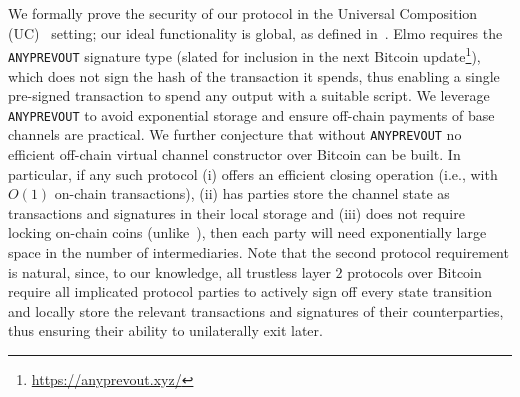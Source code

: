   We formally prove the security of our protocol in the Universal
  Composition (UC)~\cite{uc} setting; our ideal functionality is global,
  as defined in~\cite{DBLP:conf/tcc/BadertscherCHTZ20}. Elmo requires the \texttt{ANYPREVOUT} signature type (slated for
  inclusion in the next Bitcoin update\footnote{\url{https://anyprevout.xyz/}}), which does not sign the hash of the
  transaction it spends, thus enabling a single pre-signed transaction
  to spend any output with a suitable script. We leverage \texttt{ANYPREVOUT} to
  avoid exponential storage and ensure off-chain payments of base channels are
  practical. We further conjecture that without
  \texttt{ANYPREVOUT} no efficient off-chain virtual channel constructor
  over Bitcoin can be built. In particular, if any such protocol
  (i) offers an efficient closing operation (i.e., with $O(1)$ on-chain
  transactions), (ii) has parties store the channel state as transactions and
  signatures in their local storage and (iii) does not require locking on-chain
  coins (unlike~\cite{donner}), then each party will need exponentially
  large space in the number of intermediaries. Note that the second protocol
  requirement is natural, since, to our knowledge, all trustless layer $2$
  protocols over Bitcoin require all implicated protocol parties to actively
  sign off every state transition and locally store the relevant transactions
  and signatures of their counterparties, thus ensuring their ability to
  unilaterally exit later.
